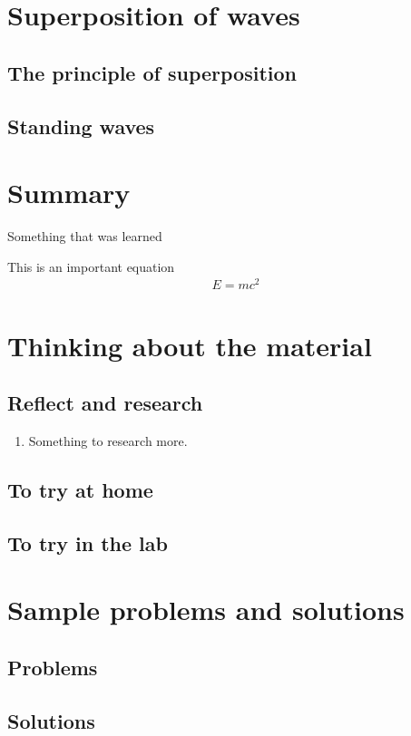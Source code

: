 \section{Superposition of waves}

\subsection{The principle of superposition}

\subsection{Standing waves}



\newpage
\section{Summary}

\begin{chapterSummary}{
\item Something that was learned
}
\end{chapterSummary}

\newpage
\begin{importantEquations}
This is an important equation
\begin{align*}
E = mc^2
\end{align*}

\end{importantEquations}


\newpage
\section{Thinking about the material}
\subsection{Reflect and research}

\begin{enumerate}
\item Something to research more.
\end{enumerate}
\subsection{To try at home}

\subsection{To try in the lab}

\newpage
\section{Sample problems and solutions}
\subsection{Problems}


\newpage
\subsection{Solutions}


